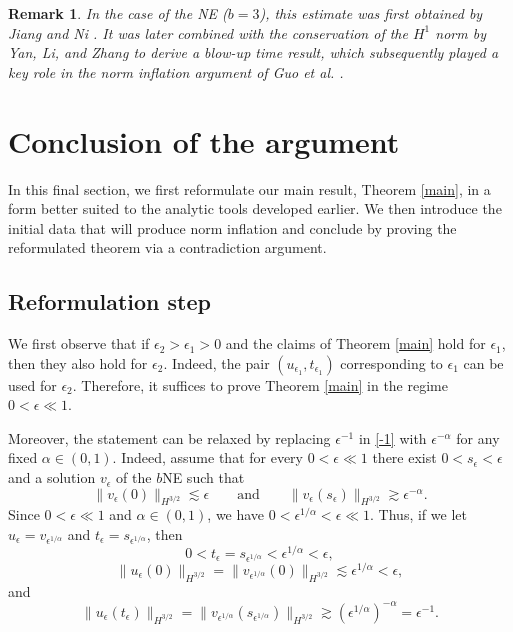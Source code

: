 \documentclass{amsart}
\newtheorem{remark}[theorem]{Remark}
\begin{document}
\begin{remark}
In the case of the NE ($b=3$), this estimate was first obtained by Jiang and Ni \cite{JN12}. It was later combined with the conservation of the $H^1$ norm by Yan, Li, and Zhang \cite{YLZ13} to derive a blow-up time result, which subsequently played a key role in the norm inflation argument of Guo et al. \cite{GLM19}.
\end{remark}



\section{Conclusion of the argument}
In this final section, we first reformulate our main result, Theorem \ref{main}, in a form better suited to the analytic tools developed earlier. We then introduce the initial data that will produce norm inflation and conclude by proving the reformulated theorem via a contradiction argument.


\subsection*{Reformulation step}
We first observe that if $\epsilon_2>\epsilon_1>0$ and the claims of Theorem \ref{main} hold for $\epsilon_1$, then they also hold for $\epsilon_2$. Indeed, the pair $(u_{\epsilon_1}, t_{\epsilon_1})$ corresponding to $\epsilon_1$ can be used for $\epsilon_2$. Therefore, it suffices to prove Theorem \ref{main} in the regime $0<\epsilon \ll 1$. 

Moreover, the statement can be relaxed by replacing $ \epsilon^{-1}$ in \eqref{-1} with $ \epsilon^{-\alpha}$ for any fixed $\alpha\in (0,1)$. Indeed, assume that for every $0<\epsilon \ll 1$ there exist $0<s_\epsilon<\epsilon$ and a solution $v_\epsilon$ of the $b$NE such that
\[
\|v_\epsilon(0)\|_{H^{3/2}}\lesssim \epsilon \qquad\text{and}\qquad \|v_\epsilon(s_\epsilon)\|_{H^{3/2}}\gtrsim \epsilon^{-\alpha}.
\]
Since $0<\epsilon \ll 1$ and $\alpha\in (0,1)$, we have $0<\epsilon^{1/\alpha}<\epsilon \ll 1$. Thus, if we let $u_\epsilon= v_{\epsilon^{1/\alpha}}$ and $t_\epsilon=s_{\epsilon^{1/\alpha}}$, then 
\[
0<t_\epsilon=s_{\epsilon^{1/\alpha}}<\epsilon^{1/\alpha}<\epsilon,
\]
\[
\|u_\epsilon(0)\|_{H^{3/2}}=\|v_{\epsilon^{1/\alpha}}(0)\|_{H^{3/2}}\lesssim \epsilon^{1/\alpha}<\epsilon,
\]
and
\[
\|u_\epsilon(t_\epsilon)\|_{H^{3/2}}= \|v_{\epsilon^{1/\alpha}}(s_{\epsilon^{1/\alpha}})\|_{H^{3/2}}\gtrsim (\epsilon^{1/\alpha})^{-\alpha}= \epsilon^{-1}.
\]
\end{document}
